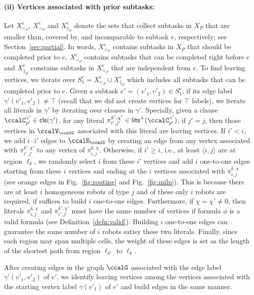 \documentclass[Afour,sageh,times]{sagej}
\newcommand{\clause}[1]{\mathsf{cls}(#1)}
\newcommand{\ag}[2]{\langle#1,#2\rangle}
\renewcommand{\ap}[3]{\mathcal{\pi}_{{#1},{#2}}^{#3}}
\begin{document}
\paragraph{(ii) Vertices associated with prior subtasks:}\label{sec:b} Let $X^e_{<_{P}}$, $X^e_{\prec_{P}}$ and $X^e_{\|_{P}}$ denote the sets that collect subtasks in $X_{P}$ that are  smaller than, covered by, and incomparable to subtask $e$, respectively; see Section~\ref{sec:partial}. In words, $X^e_{<_{P}}$ contains subtasks in $X_P$ that should be completed prior to $e$, $X^e_{\prec_{P}}$ contains subtasks that can be completed right before $e$  and $X^e_{\|_{P}}$ constains subtasks in  $X^e_{<_P}$ that are independent from $e$. To find leaving vertices, we iterate over $S_1^e = X^e_{<_{P}} \cup X^e_{\|_{P}}$ which includes all subtasks that can be completed prior to $e$.
Given a subtask $e' = (v'_1, v'_2) \in S_1^e$, if its edge label $\gamma'(v'_1, v'_2) \not=\top$ (recall that we did not create vertices for $\top$ labels), we iterate all literals in $\gamma'$ by iterating over clauses in $\gamma'$. Specially, given a clause $\ccalC^{\gamma'}_{p'} \in \clause{\gamma'}$, for any literal $\ap{i'}{j'}{k',\chi'} \in\mathsf{lits}^+(\ccalC^{\gamma'}_{p'})$, if $j'=j$, then those vertices in $\ccalV_\ccalG$ associated with this literal are leaving vertices. If $i'<i$, we add $i\cdot  i'$ edges to $\ccalE_\ccalG$ by creating an edge from any vertex associated with $\ap{i'}{j'}{k',\chi'}$ to any vertex of $\ap{i}{j}{k,\chi}$. Otherwise, if $i' \geq  i$, i.e., at least $\ag{i}{j}$ are at region $\ell_k$, we randomly select $i$ from these $i'$ vertices and add $i$ one-to-one edges starting from these $i$ vertices and ending at the $i$ vertices associated with $\ap{i}{j}{k,\chi}$ (see orange edges in Fig.~\ref{fig:routing} and Fig.~\ref{fig:milp}). This is because there are at least $i$ homogeneous robots of type $j$ and of these only $i$ robots are required, if suffices to build $i$ one-to-one edges. Furthermore, if $\chi=\chi'\neq0$, then literals $\ap{i}{j}{k,\chi}$ and $\ap{i'}{j'}{k',\chi'}$ must have the same number of vertices if formula $\phi$ is a valid formula (see Definition~\ref{defn:valid}). Building $i$ one-to-one edges can guarantee the same number of $i$ robots satisy these two literals. Finally, since each region may span multiple cells, the weight of these edges is set as the length of the shortest path from region  $\ell_{k'}$ to $\ell_k$.

After creating edges in the graph $\ccalG$ associated with the edge label  $\gamma'(v'_1,v'_2)$ of $e'$, we identify  leaving vertices  among the vertices associated with the starting vertex label $\gamma(v'_1)$ of $e'$ and build edges in the same manner. %
\end{document}
